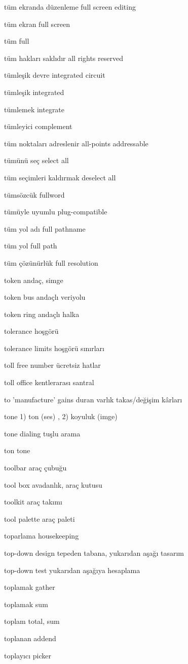 \documentclass[12pt,fleqn]{article}\usepackage{../../common}
\begin{document}
tüm ekranda düzenleme full screen editing

tüm ekran full screen

tüm full

tüm hakları saklıdır all rights reserved

tümleşik devre integrated circuit

tümleşik integrated

tümlemek integrate

tümleyici complement

tüm noktaları adreslenir all-points addressable

tümünü seç select all

tüm seçimleri kaldırmak deselect all

tümsözcük fullword

tümüyle uyumlu plug-compatible

tüm yol adı full pathname

tüm yol full path

tüm çözünürlük full resolution

token andaç, simge

token bus andaçlı veriyolu

token ring andaçlı halka

tolerance hoşgörü

tolerance limits hoşgörü sınırları

toll free number ücretsiz hatlar

toll office kentlerarası santral

to 'manufacture' gains duran varlık takas/değişim kârları

tone 1) ton (ses) , 2) koyuluk (imge)

tone dialing tuşlu arama

ton tone

toolbar araç çubuğu

tool box avadanlık, araç kutusu

toolkit araç takımı

tool palette araç paleti

toparlama housekeeping

top-down design tepeden tabana, yukarıdan aşağı tasarım

top-down test yukarıdan aşağıya hesaplama

toplamak gather

toplamak sum

toplam total, sum

toplanan addend

toplayıcı picker
\end{document}
